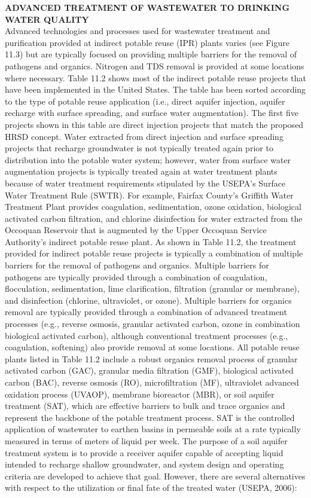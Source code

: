 \documentclass{article}
\begin{document}
\textbf{ADVANCED TREATMENT OF WASTEWATER TO DRINKING WATER QUALITY}\\
Advanced technologies and processes used for wastewater treatment and purification provided at indirect potable reuse (IPR) plants varies (see Figure 11.3) but are typically focused on providing multiple barriers for the removal of pathogens and organics. Nitrogen and TDS removal is provided at some locations where necessary. Table 11.2 shows most of the indirect potable reuse projects that have been implemented in the United States. The table has been sorted according to the type of potable reuse application (i.e., direct aquifer injection, aquifer recharge with surface spreading, and surface water augmentation). The first five projects shown in this table are direct injection
projects that match the proposed HRSD concept. Water extracted from direct injection and surface spreading projects that recharge groundwater is not typically treated again prior to distribution into the potable water system; however, water from surface water augmentation projects is typically treated again at water treatment plants because of water treatment requirements stipulated by the USEPA’s Surface Water Treatment Rule (SWTR). For example, Fairfax County’s Griffith Water Treatment Plant provides coagulation, sedimentation, ozone oxidation, biological activated carbon filtration, and chlorine disinfection for water extracted from the Occoquan Reservoir that is augmented by the Upper Occoquan Service Authority’s indirect potable reuse plant.
As shown in Table 11.2, the treatment provided for indirect potable reuse projects is typically a combination of multiple barriers for the removal of pathogens and organics. Multiple barriers for pathogens are typically provided through a combination of coagulation, flocculation, sedimentation, lime clarification, filtration (granular or membrane), and disinfection (chlorine, ultraviolet, or ozone). Multiple barriers for organics removal are typically provided through a combination of advanced
treatment processes (e.g., reverse osmosis, granular activated carbon, ozone in combination biological activated carbon), although conventional treatment processes (e.g., coagulation, softening) also provide removal at some locations. All potable reuse plants listed in Table 11.2 include a robust organics removal process of granular activated carbon (GAC), granular media filtration (GMF), biological activated carbon (BAC), reverse osmosis (RO), microfiltration (MF), ultraviolet advanced oxidation process (UVAOP), membrane bioreactor (MBR), or soil aquifer treatment (SAT), which are effective barriers to bulk and trace organics and represent the backbone of the potable treatment process. SAT is the controlled application of wastewater to earthen basins in permeable soils at a rate typically measured in terms of meters of liquid per week. The purpose of a soil aquifer treatment system is to provide a receiver aquifer capable of accepting liquid intended to recharge shallow groundwater, and system design and operating criteria are developed to achieve that goal. However, there are several alternatives with respect to the utilization or final fate of the treated water (USEPA, 2006):\\
\end{document}
